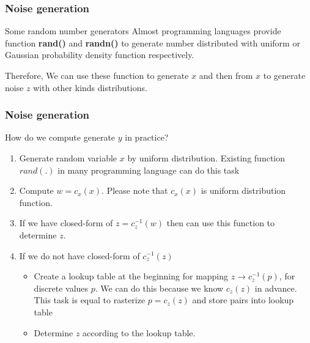 \documentclass[english,11pt,table,handout]{beamer}
\begin{document}
\frame
{
	\frametitle{Noise generation}
	
	\begin{block}{Some random number generators}
		Almost programming languages provide function \alert{\textbf{rand()}} and \alert{\textbf{randn()}} to generate number distributed with uniform or Gaussian probability density function respectively.
		
		Therefore,
		We can use these function to generate $x$ and then from $x$ to generate noise $z$ with other kinds distributions.
	\end{block}
	

	
}

\frame
{
	\frametitle{Noise generation}
	
	\begin{block}{How do we compute generate $y$ in practice?}
		\begin{enumerate}
			\item Generate random variable $x$ by uniform distribution. Existing function $rand(.)$ in many programming language can do this task
			\item Compute $w = c_x(x)$. Please note that $c_x(x)$ is uniform distribution function.
			\item If we have closed-form of $z = c_z^{-1}(w)$ then can use this function to determine $z$.
			\item If we do not have closed-form of $c_z^{-1}(z)$
			\begin{itemize}
				\item Create a lookup table at the beginning for mapping $z \rightarrow c_z^{-1}(p)$, for discrete values $p$. We can do this because we know $c_z(z)$ in advance. This task is equal to rasterize $p = c_z(z)$ and store pairs into lookup table
				\item Determine $z$ according to the lookup table.
			\end{itemize} 
			
		\end{enumerate}
		
	\end{block}
}
\end{document}
